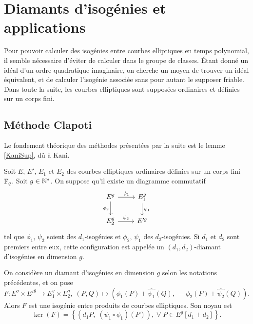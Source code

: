 \section{Diamants d'isogénies et applications }\label{SECTION Clapoti}

Pour pouvoir calculer des isogénies entre courbes elliptiques en temps polynomial, il semble nécessaire d'éviter de calculer dans le groupe de classes. Étant donné un idéal d'un ordre quadratique imaginaire, on cherche un moyen de trouver un idéal équivalent, et de calculer l'isogénie associée sans pour autant le supposer friable. Dans toute la suite, les courbes elliptiques sont supposées ordinaires et définies sur un corps fini.

\subsection{Méthode Clapoti}

Le fondement théorique des méthodes présentées par la suite est le lemme \ref{KaniSup}, dû à Kani.

\begin{Def}
	
	Soit $E$, $E'$, $E_1$ et $E_2$ des courbes elliptiques ordinaires définies sur un corps fini $\mathbb{F}_{q}$. Soit $g\in\mathbb{N}^*$. On suppose qu'il existe un diagramme commutatif
	\[\begin{tikzcd}
		E^g \arrow{r}{\phi_1} \arrow[swap]{d}{\phi_2} & E_1^g \arrow{d}{\psi_1} \\
		E_2^g \arrow{r}{\psi_2} & E'^g
	\end{tikzcd}
	\]
	tel que $\phi_1$, $\psi_2$ soient des $d_1$-isogénies et $\phi_2$, $\psi_1$ des $d_2$-isogénies. Si $d_1$ et $d_2$ sont premiers entre eux, cette configuration est appelée un $(d_1, d_2)$-diamant d'isogénies en dimension $g$.
\end{Def}

\begin{Prop}\label{KaniSup}
	
	On considère un diamant d'isogénies en dimension $g$ selon les notations précédentes, et on pose
	\begin{equation*}
		F : E^g\times E'^g\rightarrow E_1^g\times E_2^g,\;(P,Q)\mapsto \left( \phi_1(P) + \widehat{\psi_1}(Q),\;-\phi_2(P)+\widehat{\psi_2}(Q)\right).
	\end{equation*} 
	Alors $F$ est une isogénie entre produits de courbes elliptiques. Son noyau est
	\begin{equation*}
		\ker(F)=\left\lbrace \left( d_1P,\;(\psi_1\circ\phi_1)(P)\right),\;\forall\; P\in E^g[d_1 + d_2] \right\rbrace .
	\end{equation*}
\end{Prop}


